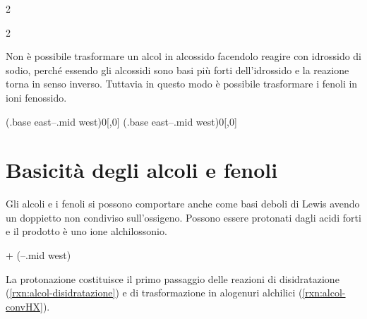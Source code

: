 \begin{reaction}
	2   
	\arrow
	 \+{1em,1em} 
\end{reaction}
\begin{reaction}
	2   
	\arrow
	 \+{1em,1em} 
\end{reaction}

Non è possibile trasformare un alcol in alcossido facendolo reagire con idrossido di sodio, perché essendo gli alcossidi sono basi più forti dell'idrossido e la reazione torna in senso inverso. Tuttavia in questo modo è possibile trasformare i fenoli in ioni fenossido.
\begin{reaction}
	 \arrow(.base east--.mid west){0}[,0] \+ 
	\arrow
	 \arrow(.base east--.mid west){0}[,0]\+ 
\end{reaction}


\section{Basicità degli alcoli e fenoli}
Gli alcoli e i fenoli si possono comportare anche come basi deboli di Lewis avendo un doppietto non condiviso sull'ossigeno. Possono essere protonati dagli acidi forti e il prodotto è uno ione alchilossonio.

\begin{reaction}
	 + 
	\arrow(--.mid west)
\end{reaction}

La protonazione costituisce il primo passaggio delle reazioni di disidratazione (\autoref{rxn:alcol-disidratazione}) e di trasformazione in alogenuri alchilici (\autoref{rxn:alcol-convHX}).

